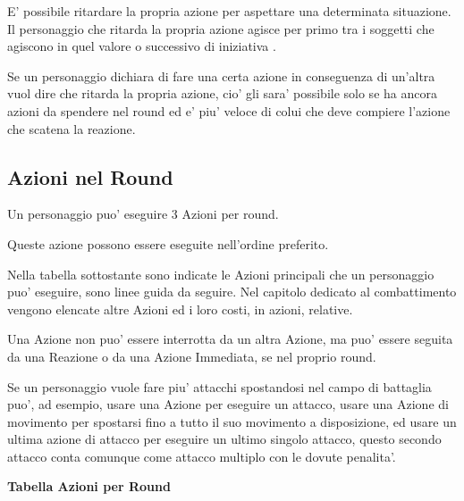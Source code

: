 \documentclass[a4paper,11pt,twoside,openany]{book}
\begin{document}
E' possibile ritardare la propria azione per aspettare una determinata situazione. Il personaggio che ritarda la propria azione agisce per primo tra i soggetti che agiscono in quel valore o successivo di iniziativa .

Se un personaggio dichiara di fare una certa azione in conseguenza di un'altra vuol dire che ritarda la propria azione, cio' gli sara' possibile solo se ha ancora azioni da spendere nel round ed e' piu' veloce di colui che deve compiere l'azione che scatena la reazione.

\subsection{Azioni nel Round}

\label{azioni-nel-round}

Un personaggio puo' eseguire 3 Azioni per round.

Queste azione possono essere eseguite nell'ordine preferito.

Nella tabella sottostante sono indicate le Azioni principali che un personaggio puo' eseguire, sono linee guida da seguire. Nel capitolo dedicato al combattimento vengono elencate altre Azioni ed i loro costi, in azioni, relative.

Una Azione non puo' essere interrotta da un altra Azione, ma puo' essere seguita da una Reazione o da una Azione Immediata, se nel proprio round.

Se un personaggio vuole fare piu' attacchi spostandosi nel campo di battaglia puo', ad esempio, usare una Azione per eseguire un attacco, usare una Azione di movimento per spostarsi fino a tutto il suo movimento a disposizione, ed usare un ultima azione di attacco per eseguire un ultimo singolo attacco, questo secondo attacco conta comunque come attacco multiplo con le dovute penalita'.

\medskip

\textbf{Tabella Azioni per Round}

\medskip
\end{document}
